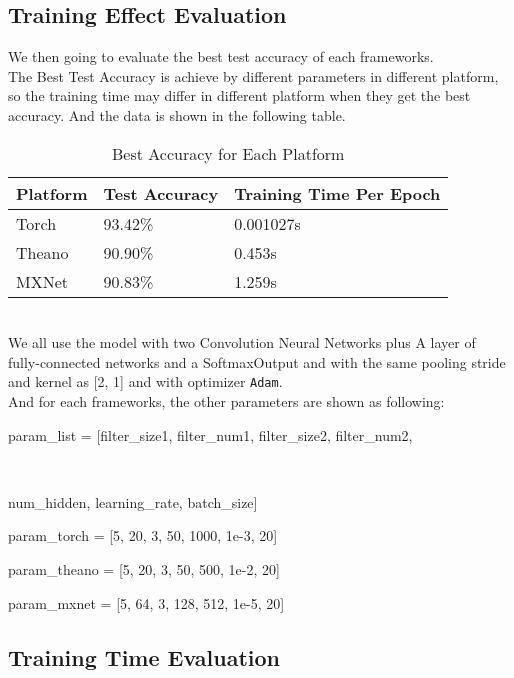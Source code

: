 \documentclass[12pt]{article}
\begin{document}
\subsection{Training Effect Evaluation}
We then going to evaluate the best test accuracy of each frameworks.\\
The Best Test Accuracy is achieve by different parameters in different platform, so the training time may differ in different platform when they get the best accuracy. And the data is shown in the following table.
\\
\begin{table}[!h]
	\caption {Best Accuracy for Each Platform} \label{tab:title} 
	\begin{center}
		\begin{tabular}{|l|l|l|}
			\hline
			Platform & Test Accuracy & Training Time Per Epoch\\
			\hline
			Torch & 93.42\% & 0.001027s \\
			\hline
			Theano & 90.90\% & 0.453s \\
			\hline
			MXNet & 90.83\% & 1.259s \\
			\hline
		\end{tabular}
	\end{center}
	\end{table}
\\
We all use the model with two Convolution Neural Networks plus A layer of fully-connected networks and a SoftmaxOutput and with the same pooling stride and kernel as [2, 1] and with optimizer \texttt{Adam}.\\
And for each frameworks, the other parameters are shown as following:\\
\centerline{param\_list = [filter\_size1, filter\_num1, filter\_size2, filter\_num2,}\\
 \centerline{num\_hidden, learning\_rate, batch\_size]}
 \centerline{param\_torch = [5, 20, 3, 50, 1000, 1e-3, 20]}
 \centerline{param\_theano = [5, 20, 3, 50, 500, 1e-2, 20]}
 \centerline{param\_mxnet = [5, 64, 3, 128, 512, 1e-5, 20]}


\subsection{Training Time Evaluation}
\end{document}
